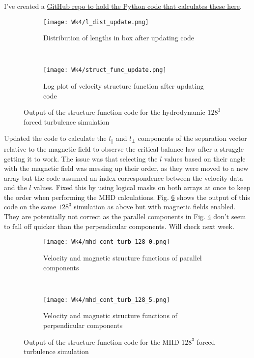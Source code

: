 \documentclass[12pt,letterpaper]{article}
\begin{document}
  I've created a \href{https://github.com/JohnstonZade/python_tools}{GitHub repo to hold the Python code that calculates these here}.

  \begin{figure}[!h]
   \centering
  \begin{subfigure}{.4\linewidth}
    \centering
  \texttt{[image: Wk4/l\_dist\_update.png]}
  \caption{Distribution of lengths in box after updating code}
  \label{fig:l_dist_update}
  \end{subfigure}
  \
  \begin{subfigure}{.4\linewidth}
    \centering
  \texttt{[image: Wk4/struct\_func\_update.png]}
  \caption{Log plot of velocity structure function after updating code}
  \label{fig:struct_func_update}
  \end{subfigure}

  \caption{Output of the structure function code for the hydrodynamic $128^3$ forced turbulence simulation}
  \label{fig:structure_plot_update}
  \end{figure}

  Updated the code to calculate the $l_{\|}$ and $l_\perp$ components of the separation vector relative to the magnetic field to observe the critical balance law after a struggle getting it to work. The issue was that selecting the $l$ values based on their angle with the magnetic field was messing up their order, as they were moved to a new array but the code assumed an index correspondence between the velocity data and the $l$ values. Fixed this by using logical masks on both arrays at once to keep the order when performing the MHD calculations. Fig. \ref{fig:l_theta_plots} shows the output of this code on the same $128^3$ simulation as above but with magnetic fields enabled. They are potentially not correct as the parallel components in Fig. \ref{fig:l_par} don't seem to fall off quicker than the perpendicular components. Will check next week.

  \begin{figure}[!h]
   \centering
  \begin{subfigure}{.4\linewidth}
    \centering
  \texttt{[image: Wk4/mhd\_cont\_turb\_128\_0.png]}
  \caption{Velocity and magnetic structure functions of parallel components}
  \label{fig:l_par}
  \end{subfigure}
  \
  \begin{subfigure}{.4\linewidth}
    \centering
  \texttt{[image: Wk4/mhd\_cont\_turb\_128\_5.png]}
  \caption{Velocity and magnetic structure functions of perpendicular components}
  \label{fig:l_perp}
  \end{subfigure}

  \caption{Output of the structure function code for the MHD $128^3$ forced turbulence simulation}
  \label{fig:l_theta_plots}
  \end{figure}
\end{document}
